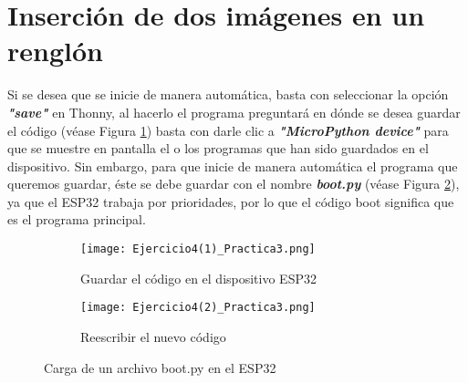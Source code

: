 \documentclass{article}
\begin{document}
\section{Inserción de dos imágenes en un renglón}
Si se desea que se inicie de manera automática, basta con seleccionar la opción \textbf{\textit{"save"}} en Thonny, al hacerlo el programa preguntará en dónde se desea guardar el código (véase Figura \ref{fig:Ejercicio4(1)_Practica3}) basta con darle clic a \textbf{\textit{"MicroPython device"}} para que se muestre en pantalla el o los programas que han sido guardados en el dispositivo. Sin embargo, para que inicie de manera automática el programa que queremos guardar, éste se debe guardar con el nombre \textbf{\textit{boot.py}} (véase Figura \ref{fig:Ejercicio4(2)_Practica3}), ya que el ESP32 trabaja por prioridades, por lo que el código boot significa que es el programa principal.
\begin{figure}[h]
    \centering
    \begin{subfigure}[b]{0.4\linewidth}
        \texttt{[image: Ejercicio4(1)\_Practica3.png]}
        \caption{Guardar el código en el dispositivo ESP32}
        \label{fig:Ejercicio4(1)_Practica3}
    \end{subfigure}
    \begin{subfigure}[b]{0.4\linewidth}
        \texttt{[image: Ejercicio4(2)\_Practica3.png]}
        \caption{Reescribir el nuevo código}
        \label{fig:Ejercicio4(2)_Practica3}
    \end{subfigure}
    \caption{Carga de un archivo boot.py en el ESP32}
    \label{fig:Ejercicio4}
\end{figure}
\end{document}
